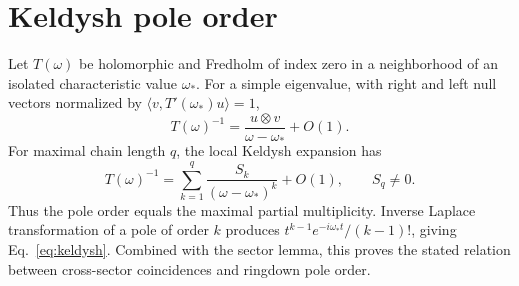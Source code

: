 \documentclass[10pt]{article}
\theoremstyle{plain}
\begin{document}
\section{Keldysh pole order}

Let $T(\omega)$ be holomorphic and Fredholm of index zero in a neighborhood of
an isolated characteristic value $\omega_*$. For a simple eigenvalue, with right
and left null vectors normalized by $\langle v,T'(\omega_*)u\rangle=1$,
\begin{equation}
T(\omega)^{-1}=\frac{u\otimes v}{\omega-\omega_*}+O(1).
\end{equation}
For maximal chain length $q$, the local Keldysh expansion has
\begin{equation}
T(\omega)^{-1}=\sum_{k=1}^{q}\frac{S_k}{(\omega-\omega_*)^k}+O(1),
\qquad S_q\neq0 .
\end{equation}
Thus the pole order equals the maximal partial multiplicity. Inverse Laplace
transformation of a pole of order $k$ produces
$t^{k-1}e^{-i\omega_*t}/(k-1)!$, giving Eq.~\eqref{eq:keldysh}. Combined with
the sector lemma, this proves the stated relation between cross-sector
coincidences and ringdown pole order.
\end{document}
